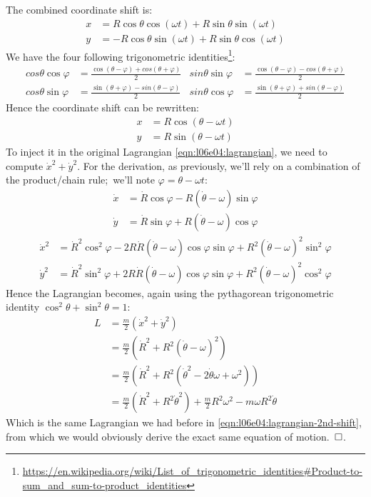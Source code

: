 \documentclass[solutions.tex]{subfiles}
\begin{document}
The combined coordinate shift is:
\begin{align*}
	x &= R\cos\theta\cos(\omega t) + R\sin\theta\sin(\omega t)\\
	y &= -R\cos\theta\sin(\omega t) + R\sin\theta\cos(\omega t)
\end{align*}
We have the four following trigonometric identities\footnote{
\url{https://en.wikipedia.org/wiki/List\_of\_trigonometric\_identities\#Product-to-sum\_and\_sum-to-product\_identities}}:
\begin{align*}
	cos\theta\cos\varphi &= \frac{\cos(\theta-\varphi)+cos(\theta+\varphi)}{2}
	& sin\theta\sin\varphi &= \frac{\cos(\theta-\varphi)-cos(\theta+\varphi)}{2}\\
	cos\theta\sin\varphi &= \frac{\sin(\theta+\varphi)-sin(\theta-\varphi)}{2}
	& sin\theta\cos\varphi &= \frac{\sin(\theta+\varphi)+sin(\theta-\varphi)}{2}
\end{align*}
Hence the coordinate shift can be rewritten:
\begin{align}
	x &= R\cos(\theta-\omega t)\nonumber\\
	y &= R\sin(\theta-\omega t)
	\label{eqn:l06e04:combined-shift}
\end{align}
To inject it in the original Lagrangian \eqref{eqn:l06e04:lagrangian},
we need to compute $\dot{x}^2+\dot{y}^2$. For the derivation, as previously,
we'll rely on a combination of the product/chain rule; we'll note
$\varphi=\theta-\omega t$:
\begin{align*}
	\dot{x} &= \dot{R}\cos\varphi - R(\dot\theta-\omega)\sin\varphi \\
	\dot{y} &= \dot{R}\sin\varphi + R(\dot\theta-\omega)\cos\varphi
\end{align*}
\begin{align*}
	\dot{x}^2 &= \dot{R}^2\cos^2\varphi
		- 2R\dot{R}(\dot\theta-\omega)\cos\varphi\sin\varphi
		+ R^2(\dot\theta-\omega)^2\sin^2\varphi \\
	\dot{y}^2 &= \dot{R}^2\sin^2\varphi
		+ 2R\dot{R}(\dot\theta-\omega)\cos\varphi\sin\varphi
		+R^2(\dot\theta-\omega)^2\cos^2\varphi
\end{align*}
Hence the Lagrangian becomes, again using the pythagorean trigonometric
identity $\cos^2\theta+\sin^2\theta = 1$:
\begin{align*}
	L &= \frac{m}{2}\left(\dot{x}^2+\dot{y}^2\right) \\
	~ &= \boxed{\frac{m}{2}\left(\dot{R}^2+R^2(\dot\theta-\omega)^2\right)} \\
	~ &= \frac{m}{2}\left(\dot{R}^2+R^2(\dot\theta^2-2\dot\theta\omega+\omega^2)\right) \\
	~ &= \frac{m}{2}(\dot{R}^2+R^2\dot\theta^2)+\frac{m}{2}R^2\omega^2-m\omega R^2\dot\theta
\end{align*}
Which is the same Lagrangian we had before in
\eqref{eqn:l06e04:lagrangian-2nd-shift}, from which
we would obviously derive the exact same equation of motion. $\qed$.
\end{document}
